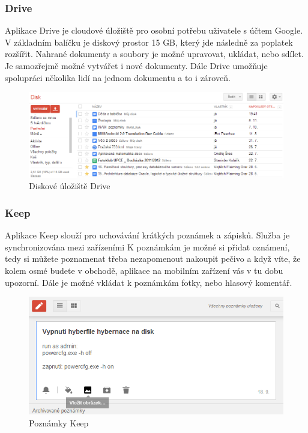 \subsubsection{Drive}
Aplikace Drive je cloudové úložiště pro osobní potřebu uživatele s účtem Google. V základním balíčku je diskový prostor 15 GB, který jde následně za poplatek rozšířit. Nahrané dokumenty a soubory je možné upravovat, ukládat, nebo sdílet. Je samozřejmě možné vytvářet i nové dokumenty. Dále Drive umožňuje spolupráci několika lidí na jednom dokumentu a to i zároveň.
\begin{figure}[htbp]
	\centering
		\includegraphics[width=1.00\textwidth]{ext/googleDrive.png}
	\caption{Diskové úložiště Drive}
	\label{fig:googleDrive}
\end{figure}

\subsubsection{Keep}
Aplikace Keep slouží pro uchovávání krátkých poznámek a zápisků. Služba je synchronizována mezi zařízeními K poznámkám je možné si přidat oznámení, tedy si můžete poznamenat třeba nezapomenout nakoupit pečivo a když víte, že kolem osmé budete v obchodě, aplikace na mobilním zařízení vás v tu dobu upozorní. Dále je možné vkládat k poznámkám fotky, nebo hlasový komentář.
\begin{figure}[htbp]
	\centering
		\includegraphics[width=1.00\textwidth]{ext/googleKeep.png}
	\caption{Poznámky Keep}
	\label{fig:googleKeep}
\end{figure}


